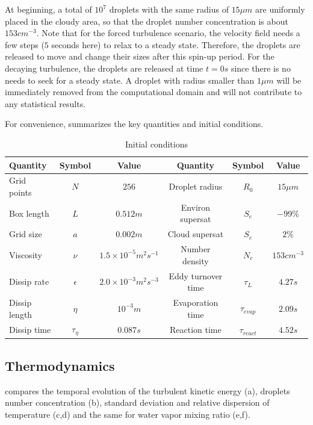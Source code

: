 At beginning, a total of $10^{7}$ droplets with the same radius of $15\mu m$
are uniformly placed in the cloudy area, so that the droplet number
concentration is about $153{cm}^{-3}$. Note that for the forced turbulence
scenario, the velocity field needs a few steps ($5$ seconds here) to relax to a
steady state. Therefore, the droplets are released to move and change their
sizes after this spin-up period. For the decaying
turbulence, the droplets are released at time $t = 0s$ since there is no needs
to seek for a steady state. A droplet with radius smaller than $1\mu m$ will be
immediately removed from the computational domain and will not contribute to
any statistical results.

For convenience,  summarizes the key quantities and initial conditions.
\begin{table}[!htbp]
\centering
\begin{adjustbox}{max width = \textwidth}
\begin{tabular}{l c c c c c}
\hline\hline
Quantity & Symbol & Value & Quantity & Symbol & Value\\
\hline
Grid points & $N$ & $256$ & Droplet radius & $R_{0}$ & $15\mu m$\\
Box length & $L$ & $0.512m$ & Environ supersat & $S_{e}$ & $-99\%$\\
Grid size & $a$ & $0.002m$ & Cloud supersat & $S_{c}$ & $2\%$\\
Viscosity & $\nu$ & $1.5\times10^{-5}m^{2}s^{-1}$ & Number density& $N_{c}$ & $153cm^{-3}$\\
Dissip rate& $\epsilon$ & $2.0\times10^{-3}m^{2}s^{-3}$ & Eddy turnover time & $\tau_{L}$ & $4.27s$\\
Dissip length& $\eta$ & $10^{-3}m$ & Evaporation time & $\tau_{evap}$ & $2.09s$\\
Dissip time& $\tau_{\eta}$ & $0.087s$ & Reaction time & $\tau_{react}$ & $4.52s$\\
\hline
\end{tabular}
\end{adjustbox}
\caption{Initial conditions}
\label{tb:parameters}
\end{table}

\subsection{Thermodynamics}
 compares the temporal evolution of the turbulent kinetic
energy (a), droplets number concentration (b), standard deviation and relative
dispersion of temperature (c,d) and the same for water vapor mixing ratio
(e,f).

